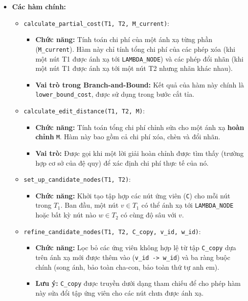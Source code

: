 \documentclass{article}
\begin{document}
\begin{itemize}
    \item \textbf{Các hàm chính:}
    \begin{itemize}
        \item \texttt{calculate\_partial\_cost(T1, T2, M\_current)}:
            \begin{itemize}
                \item \textbf{Chức năng:} Tính toán chi phí của một ánh xạ từng phần (\texttt{M\_current}). Hàm này chỉ tính tổng chi phí của các phép xóa (khi một nút T1 được ánh xạ tới \texttt{LAMBDA\_NODE}) và các phép đổi nhãn (khi một nút T1 được ánh xạ tới một nút T2 nhưng nhãn khác nhau).
                \item \textbf{Vai trò trong Branch-and-Bound:} Kết quả của hàm này chính là \texttt{lower\_bound\_cost}, được sử dụng trong bước cắt tỉa.
            \end{itemize}
        \item \texttt{calculate\_edit\_distance(T1, T2, M)}:
            \begin{itemize}
                \item \textbf{Chức năng:} Tính toán tổng chi phí chỉnh sửa cho một ánh xạ \textbf{hoàn chỉnh} \texttt{M}. Hàm này bao gồm cả chi phí xóa, chèn và đổi nhãn.
                \item \textbf{Vai trò:} Được gọi khi một lời giải hoàn chỉnh được tìm thấy (trường hợp cơ sở của đệ quy) để xác định chi phí thực tế của nó.
            \end{itemize}
        \item \texttt{set\_up\_candidate\_nodes(T1, T2)}:
            \begin{itemize}
                \item \textbf{Chức năng:} Khởi tạo tập hợp các nút ứng viên (\texttt{C}) cho mỗi nút trong $T_1$. Ban đầu, một nút $v \in T_1$ có thể ánh xạ tới \texttt{LAMBDA\_NODE} hoặc bất kỳ nút nào $w \in T_2$ có cùng độ sâu với $v$.
            \end{itemize}
        \item \texttt{refine\_candidate\_nodes(T1, T2, C\_copy, v\_id, w\_id)}:
            \begin{itemize}
                \item \textbf{Chức năng:} Lọc bỏ các ứng viên không hợp lệ từ tập \texttt{C\_copy} dựa trên ánh xạ mới được thêm vào (\texttt{v\_id -> w\_id}) và ba ràng buộc chính (song ánh, bảo toàn cha-con, bảo toàn thứ tự anh em).
                \item \textbf{Lưu ý:} \texttt{C\_copy} được truyền dưới dạng tham chiếu để cho phép hàm này sửa đổi tập ứng viên cho các nút chưa được ánh xạ.

\end{itemize}
\end{itemize}
\end{itemize}
\end{document}
